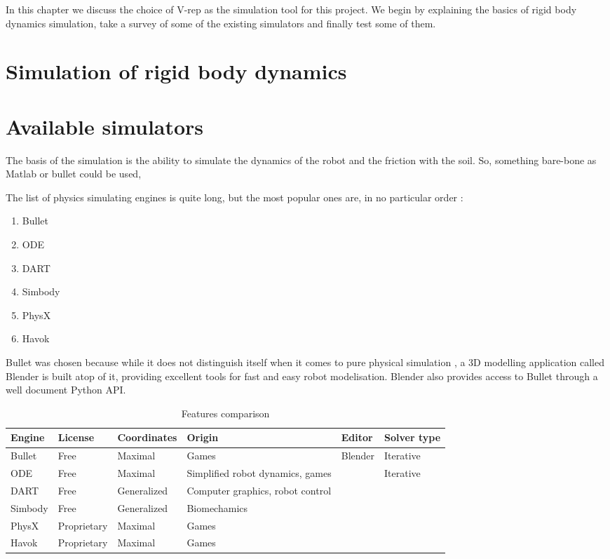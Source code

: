 In this chapter we discuss the choice of V-rep as the simulation tool for this project. We begin by explaining the basics of rigid body dynamics simulation, take a survey of some of the existing simulators and finally test some of them.

\section{Simulation of rigid body dynamics}

\section{Available simulators}
The basis of the simulation is the ability to simulate the dynamics of the robot and the friction with the soil. So, something bare-bone as Matlab or bullet could be used, 

\cite{blender_for_robotics}
The list of physics simulating engines is quite long, but the most popular ones are, in no particular order :
\begin{enumerate}
\item Bullet
\item ODE
\item DART
\item Simbody
\item PhysX
\item Havok
\end{enumerate}
Bullet was chosen because while it does not distinguish itself when it comes to pure physical simulation \cite{engines_comparison}, a 3D modelling application called Blender is built atop of it, providing excellent tools for fast and easy robot modelisation. Blender also provides access to Bullet through a well document Python API.

\begin{table}[htp]
\center
\begin{tabularx}{\textwidth}{@{} X X X X X X @{}}
\toprule
\textbf{Engine} & \textbf{License} & \textbf{Coordinates} & \textbf{Origin} & \textbf{Editor} &\textbf{Solver type}\\ 
\midrule
Bullet & Free & Maximal & Games & Blender & Iterative \\ 

ODE & Free & Maximal & Simplified robot dynamics, games & & Iterative\\ 

DART & Free & Generalized & Computer graphics, robot control & &\\

Simbody & Free & Generalized & Biomechamics & \\

PhysX & Proprietary & Maximal & Games & \\

Havok & Proprietary & Maximal & Games & \\
\bottomrule
\end{tabularx}
\caption{Features comparison}
\label{table:specs}
\end{table}

